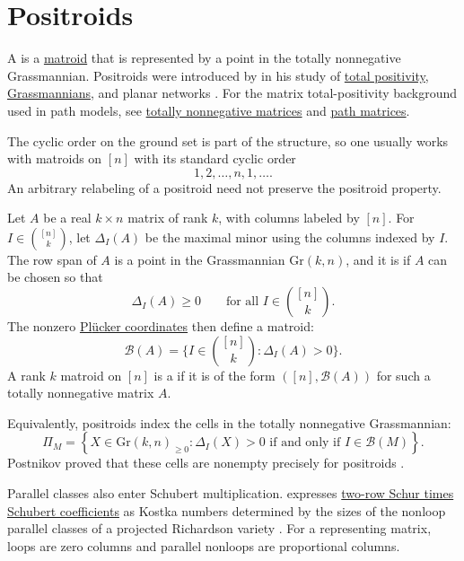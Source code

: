 

\section[positroid]{Positroids}

A \label{positroidDefinition} is a
\hyperref[matroidDefinition]{matroid} that is represented by a point in the
totally nonnegative Grassmannian.  Positroids were introduced by
 in his study of
\hyperref[totalPositivity]{total positivity},
\hyperref[grassmannianVarieties]{Grassmannians}, and planar networks
\cite{Postnikov2006x}.  For the matrix total-positivity background used in path
models, see \hyperref[totallyNonnegative]{totally nonnegative matrices} and
\hyperref[tnnPathMatrix]{path matrices}.

The cyclic order on the ground set is part of the structure, so one usually
works with matroids on $[n]$ with its standard cyclic order
\[
  1,2,\dotsc,n,1,\dotsc .
\]
An arbitrary relabeling of a positroid need not preserve the positroid
property.

Let $A$ be a real $k\times n$ matrix of rank $k$, with columns labeled by
$[n]$.  For $I\in \binom{[n]}{k}$, let $\Delta_I(A)$ be the maximal minor using
the columns indexed by $I$.  The row span of $A$ is a point in the Grassmannian
$\mathrm{Gr}(k,n)$, and it is  if $A$ can be chosen
so that
\[
  \Delta_I(A) \geq 0
  \qquad \text{for all } I\in \binom{[n]}{k}.
\]
The nonzero \hyperref[pluckerCoordinate]{Pl{\"u}cker coordinates} then define
a matroid:
\[
  \mathcal{B}(A)
  =
  \{ I\in \binom{[n]}{k} : \Delta_I(A) > 0 \}.
\]
A rank $k$ matroid on $[n]$ is a  if it is of the form
$([n],\mathcal{B}(A))$ for such a totally nonnegative matrix $A$.

Equivalently, positroids index the cells in the totally nonnegative
Grassmannian:
\[
  \Pi_M =
  \left\{
    X\in \mathrm{Gr}(k,n)_{\geq 0} :
    \Delta_I(X) > 0 \text{ if and only if } I\in \mathcal{B}(M)
  \right\}.
\]
Postnikov proved that these cells are nonempty precisely for positroids
\cite{Postnikov2006x}.


Parallel classes also enter Schubert multiplication.
 expresses
\hyperref[schubertTwoRowProduct]{two-row Schur times Schubert coefficients}
as Kostka numbers determined by the sizes of the nonloop parallel classes
of a projected Richardson variety \cite[Thm.~1.1]{Yu2026TwoRowSchubertx}.
For a representing matrix, loops are zero columns and parallel nonloops
are proportional columns.

